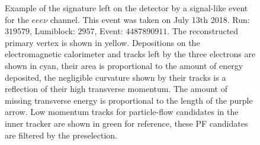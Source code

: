 \begin{figure}
  \centering
  \vfil
  \caption{Example of the signature left on the detector by a signal-like event
    for the $eee\nu$ channel. This event was taken on July 13th 2018. Run: $319579$,
    Lumiblock: $2957$, Event: $4487890911$. The reconstructed primary vertex is shown in yellow.
    Depositions on the electromagnetic calorimeter and tracks left by the three electrons
    are shown in cyan, their area is proportional to the amount of energy deposited,
    the negligible curvature
    shown by their tracks is a reflection of their high transverse momentum. 
    The amount of missing transverse energy is proportional to the length of the purple arrow. Low momentum
    tracks for particle-flow candidates in the inner tracker are shown in green for
    reference, these PF candidates are filtered by the preselection. }
  \label{fig:Fireworks_eeev}
\end{figure}


